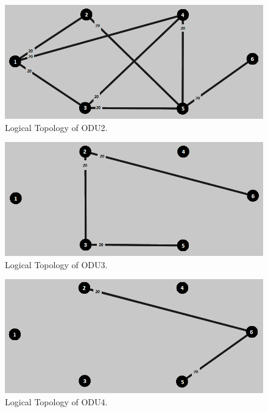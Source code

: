 \begin{figure}[H]
\centering
\includegraphics[width=13cm]{sdf/heuristic/figures/topologies/opaque_protec/high/logical_topology_odu2_high}
\caption{Logical Topology of ODU2.}
\label{logical_ODU2_protec_ref_high_heuristic}
\end{figure}

\begin{figure}[H]
\centering
\includegraphics[width=13cm]{sdf/heuristic/figures/topologies/opaque_protec/high/logical_topology_odu3_high}
\caption{Logical Topology of ODU3.}
\label{logical_ODU3_protec_ref_high_heuristic}
\end{figure}

\begin{figure}[H]
\centering
\includegraphics[width=13cm]{sdf/heuristic/figures/topologies/opaque_protec/high/logical_topology_odu4_high}
\caption{Logical Topology of ODU4.}
\label{logical_ODU4_protec_ref_high_heuristic}
\end{figure}

